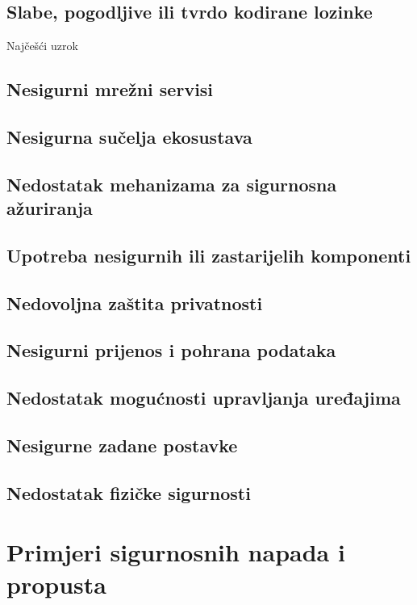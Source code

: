 \documentclass[times, utf8, diplomski]{fer}
\begin{document}
\subsection{Slabe, pogodljive ili tvrdo kodirane lozinke}
Najčešći uzrok

\subsection{Nesigurni mrežni servisi}

\subsection{Nesigurna sučelja ekosustava}

\subsection{Nedostatak mehanizama za sigurnosna ažuriranja}

\subsection{Upotreba nesigurnih ili zastarijelih komponenti}

\subsection{Nedovoljna zaštita privatnosti}

\subsection{Nesigurni prijenos i pohrana podataka}

\subsection{Nedostatak mogućnosti upravljanja uređajima}

\subsection{Nesigurne zadane postavke}

\subsection{Nedostatak fizičke sigurnosti}

\section{Primjeri sigurnosnih napada i propusta}
\end{document}
